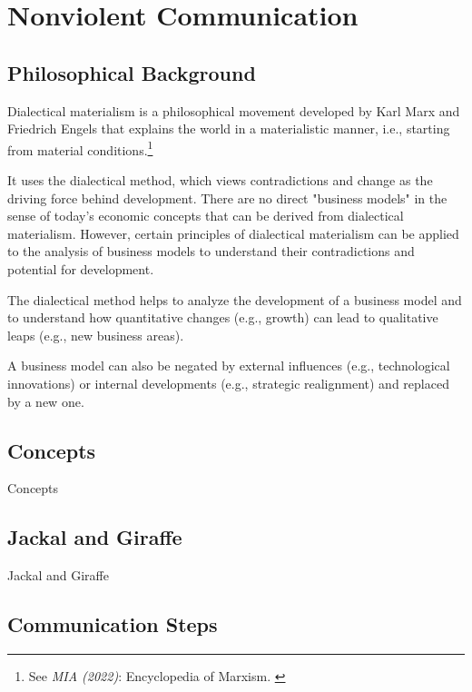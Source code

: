 %
%

\pagebreak
\section{Nonviolent Communication}

\onehalfspacing

\subsection{Philosophical Background}

Dialectical materialism is a philosophical movement developed by Karl Marx and Friedrich Engels that explains the world in a materialistic manner, i.e., starting from material conditions.\footnote{See \textit{MIA (2022)}: Encyclopedia of Marxism. \cite{diaMat}}

It uses the dialectical method, which views contradictions and change as the driving force behind development. There are no direct "business models" in the sense of today's economic concepts that can be derived from dialectical materialism. However, certain principles of dialectical materialism can be applied to the analysis of business models to understand their contradictions and potential for development.

The dialectical method helps to analyze the development of a business model and to understand how quantitative changes (e.g., growth) can lead to qualitative leaps (e.g., new business areas).

A business model can also be negated by external influences (e.g., technological innovations) or internal developments (e.g., strategic realignment) and replaced by a new one.

\subsection{Concepts}

Concepts

\subsection{Jackal and Giraffe}

Jackal and Giraffe

\subsection{Communication Steps}

